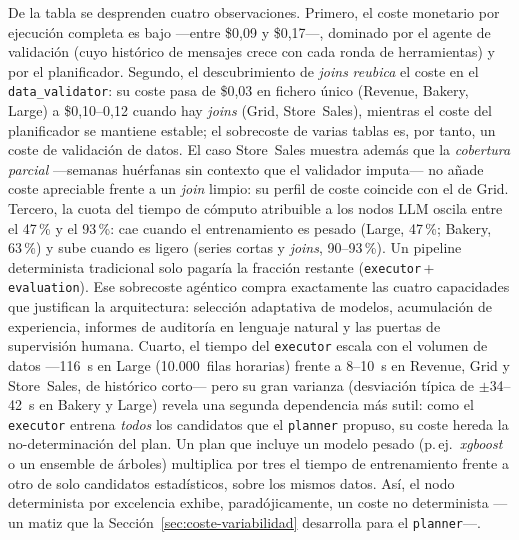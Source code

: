 De la tabla se desprenden cuatro observaciones. Primero, el coste monetario por ejecución
completa es bajo —entre \$0,09 y \$0,17—, dominado por el agente de validación
(cuyo histórico de mensajes crece con cada ronda de herramientas) y por el planificador.
Segundo, el descubrimiento de \textit{joins} \emph{reubica} el coste en el
\texttt{data\_validator}: su coste pasa de \$0,03 en fichero único (Revenue, Bakery, Large)
a \$0,10--0,12 cuando hay \textit{joins} (Grid, Store~Sales), mientras el coste del
planificador se mantiene estable; el sobrecoste de varias tablas es, por tanto, un coste de
validación de datos. El caso Store~Sales muestra además que la \emph{cobertura parcial} —semanas
huérfanas sin contexto que el validador imputa— no añade coste apreciable frente a un
\textit{join} limpio: su perfil de coste coincide con el de Grid. Tercero, la cuota del tiempo de cómputo atribuible a los nodos LLM
oscila entre el 47\,\% y el 93\,\%: cae cuando el entrenamiento es pesado (Large, 47\,\%;
Bakery, 63\,\%) y sube cuando es ligero (series cortas y \textit{joins}, 90--93\,\%). Un
pipeline determinista tradicional solo pagaría la fracción restante
(\texttt{executor}\,+\,\texttt{evaluation}). Ese sobrecoste agéntico compra exactamente
las cuatro capacidades que justifican la arquitectura: selección adaptativa de modelos,
acumulación de experiencia, informes de auditoría en lenguaje natural y las puertas de
supervisión humana. Cuarto, el tiempo del \texttt{executor} escala con el volumen de datos
—116~s en Large (10.000~filas horarias) frente a 8--10~s en Revenue, Grid y Store~Sales, de
histórico corto— pero su gran varianza (desviación típica de $\pm$34--42~s en Bakery y
Large) revela una segunda dependencia más sutil: como el \texttt{executor} entrena
\emph{todos} los candidatos que el \texttt{planner} propuso, su coste hereda la
no-determinación del plan. Un plan que incluye un modelo pesado (p.\,ej.\ \textit{xgboost} o
un ensemble de árboles) multiplica por tres el tiempo de entrenamiento frente a otro de
solo candidatos estadísticos, sobre los mismos datos. Así, el nodo determinista por
excelencia exhibe, paradójicamente, un coste no determinista —un matiz que la
Sección~\ref{sec:coste-variabilidad} desarrolla para el \texttt{planner}—.


